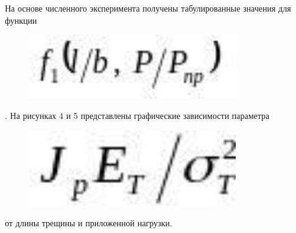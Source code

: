 На основе численного эксперимента получены табулированные значения для
функции \begin{figure}[H]
	\centering
	\includegraphics[width=0.8\textwidth]{assets/1176}
	\caption*{}
\end{figure}. На рисунках 4 и 5
представлены графические зависимости параметра
\begin{figure}[H]
	\centering
	\includegraphics[width=0.8\textwidth]{assets/1177}
	\caption*{}
\end{figure} от длины трещины и приложенной
нагрузки.

